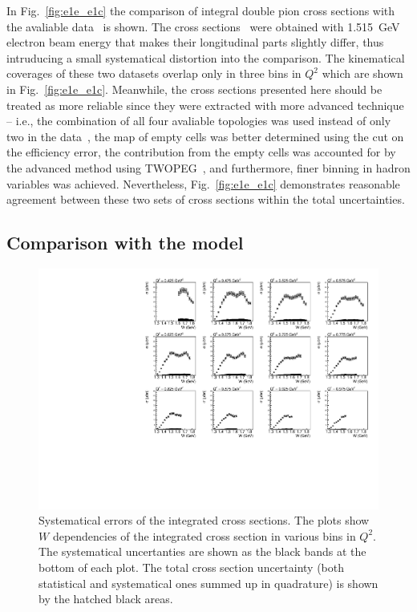\documentclass[prc,twocolumn,superscriptaddress,showpacs,amssymb,amsmath,amsfonts,linenumbers,aps]{revtex4-1}
\begin{document}
In Fig.~\ref{fig:e1e_e1c} the comparison of integral double pion cross sections with the avaliable data~\cite{Fedotov:2008aa} is shown. 
The cross sections~\cite{Fedotov:2008aa} were obtained with 1.515~GeV electron beam energy that makes their longitudinal parts slightly differ, thus intruducing a small systematical distortion into the comparison. The kinematical coverages of these two datasets overlap only in three bins in $Q^{2}$ which are shown in Fig.~\ref{fig:e1e_e1c}. Meanwhile, the cross sections presented here should be treated as more reliable since they were extracted with more advanced technique -- i.e., the combination of all four avaliable topologies was used instead of only two in the data~\cite{Fedotov:2008aa}, the map of empty cells was better determined using  the cut on the efficiency error, the contribution from the empty cells was accounted for by the advanced method using TWOPEG~\cite{Skorodum:EG}, and furthermore, finer binning in hadron variables was achieved. Nevertheless, Fig.~\ref{fig:e1e_e1c} demonstrates reasonable agreement between these two sets of cross sections within the total uncertainties.  


\subsection{Comparison with the model }

\begin{figure}[htp]
\begin{center}
\includegraphics[width=15cm]{pictures/sys_err/sys_err.pdf}
\caption{\small Systematical errors of the integrated cross sections. The plots show $W$ dependencies of the integrated cross section in various bins in $Q^{2}$. The systematical uncertanties are shown as the black bands at the bottom of each plot. The total cross section uncertainty (both statistical and systematical ones summed up in quadrature) is shown by the hatched black areas.}
\label{fig:sys_err}

\end{center}
\end{figure}
\end{document}
